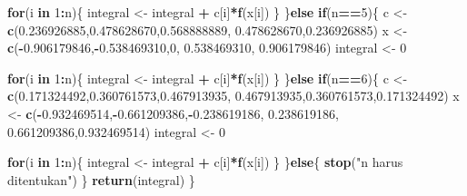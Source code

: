 \documentclass[
]{book}
\newenvironment{Shaded}{\begin{snugshade}}{\end{snugshade}}
\newcommand{\ControlFlowTok}[1]{\textcolor[rgb]{0.13,0.29,0.53}{\textbf{#1}}}
\newcommand{\DecValTok}[1]{\textcolor[rgb]{0.00,0.00,0.81}{#1}}
\newcommand{\FloatTok}[1]{\textcolor[rgb]{0.00,0.00,0.81}{#1}}
\newcommand{\FunctionTok}[1]{\textcolor[rgb]{0.13,0.29,0.53}{\textbf{#1}}}
\newcommand{\NormalTok}[1]{#1}
\newcommand{\OtherTok}[1]{\textcolor[rgb]{0.56,0.35,0.01}{#1}}
\newcommand{\SpecialCharTok}[1]{\textcolor[rgb]{0.81,0.36,0.00}{\textbf{#1}}}
\newcommand{\StringTok}[1]{\textcolor[rgb]{0.31,0.60,0.02}{#1}}
\theoremstyle{definition}
\theoremstyle{definition}
\theoremstyle{definition}
\theoremstyle{definition}
\theoremstyle{remark}
\begin{document}
\begin{Shaded}
\begin{Highlighting}[]
      \ControlFlowTok{for}\NormalTok{(i }\ControlFlowTok{in} \DecValTok{1}\SpecialCharTok{:}\NormalTok{n)\{}
\NormalTok{        integral }\OtherTok{\textless{}{-}}\NormalTok{ integral }\SpecialCharTok{+}\NormalTok{ c[i]}\SpecialCharTok{*}\FunctionTok{f}\NormalTok{(x[i])}
\NormalTok{      \}}
\NormalTok{    \}}\ControlFlowTok{else} \ControlFlowTok{if}\NormalTok{(n}\SpecialCharTok{==}\DecValTok{5}\NormalTok{)\{}
\NormalTok{      c }\OtherTok{\textless{}{-}} \FunctionTok{c}\NormalTok{(}\FloatTok{0.236926885}\NormalTok{,}\FloatTok{0.478628670}\NormalTok{,}\FloatTok{0.568888889}\NormalTok{,}
              \FloatTok{0.478628670}\NormalTok{,}\FloatTok{0.236926885}\NormalTok{)}
\NormalTok{      x }\OtherTok{\textless{}{-}} \FunctionTok{c}\NormalTok{(}\SpecialCharTok{{-}}\FloatTok{0.906179846}\NormalTok{,}\SpecialCharTok{{-}}\FloatTok{0.538469310}\NormalTok{,}\DecValTok{0}\NormalTok{,}
             \FloatTok{0.538469310}\NormalTok{, }\FloatTok{0.906179846}\NormalTok{)}
\NormalTok{      integral }\OtherTok{\textless{}{-}} \DecValTok{0}
      
      \ControlFlowTok{for}\NormalTok{(i }\ControlFlowTok{in} \DecValTok{1}\SpecialCharTok{:}\NormalTok{n)\{}
\NormalTok{        integral }\OtherTok{\textless{}{-}}\NormalTok{ integral }\SpecialCharTok{+}\NormalTok{ c[i]}\SpecialCharTok{*}\FunctionTok{f}\NormalTok{(x[i])}
\NormalTok{      \}}
\NormalTok{    \}}\ControlFlowTok{else} \ControlFlowTok{if}\NormalTok{(n}\SpecialCharTok{==}\DecValTok{6}\NormalTok{)\{}
\NormalTok{      c }\OtherTok{\textless{}{-}} \FunctionTok{c}\NormalTok{(}\FloatTok{0.171324492}\NormalTok{,}\FloatTok{0.360761573}\NormalTok{,}\FloatTok{0.467913935}\NormalTok{,}
              \FloatTok{0.467913935}\NormalTok{,}\FloatTok{0.360761573}\NormalTok{,}\FloatTok{0.171324492}\NormalTok{)}
\NormalTok{      x }\OtherTok{\textless{}{-}} \FunctionTok{c}\NormalTok{(}\SpecialCharTok{{-}}\FloatTok{0.932469514}\NormalTok{,}\SpecialCharTok{{-}}\FloatTok{0.661209386}\NormalTok{,}\SpecialCharTok{{-}}\FloatTok{0.238619186}\NormalTok{,}
             \FloatTok{0.238619186}\NormalTok{, }\FloatTok{0.661209386}\NormalTok{,}\FloatTok{0.932469514}\NormalTok{)}
\NormalTok{      integral }\OtherTok{\textless{}{-}} \DecValTok{0}
      
      \ControlFlowTok{for}\NormalTok{(i }\ControlFlowTok{in} \DecValTok{1}\SpecialCharTok{:}\NormalTok{n)\{}
\NormalTok{        integral }\OtherTok{\textless{}{-}}\NormalTok{ integral }\SpecialCharTok{+}\NormalTok{ c[i]}\SpecialCharTok{*}\FunctionTok{f}\NormalTok{(x[i])}
\NormalTok{      \}}
\NormalTok{    \}}\ControlFlowTok{else}\NormalTok{\{}
      \FunctionTok{stop}\NormalTok{(}\StringTok{"n harus ditentukan"}\NormalTok{)}
\NormalTok{    \}}
    \FunctionTok{return}\NormalTok{(integral)}
\NormalTok{\}}
\end{Highlighting}
\end{Shaded}
\end{document}

